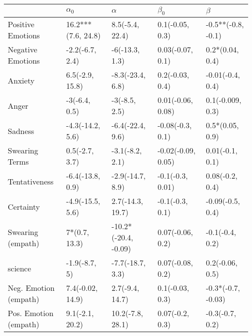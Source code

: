 \begin{tabular}{lllll}
\toprule
{} &          $\alpha_0$ &              $\alpha$ &           $\beta_0$ &             $\beta$ \\
\midrule
Positive Emotions     &  16.2***(7.6, 24.8) &       8.5(-5.4, 22.4) &     0.1(-0.05, 0.3) &  -0.5**(-0.8, -0.1) \\
Negative Emotions     &     -2.2(-6.7, 2.4) &        -6(-13.3, 1.3) &    0.03(-0.07, 0.1) &     0.2*(0.04, 0.4) \\
Anxiety               &     6.5(-2.9, 15.8) &      -8.3(-23.4, 6.8) &     0.2(-0.03, 0.4) &    -0.01(-0.4, 0.4) \\
Anger                 &       -3(-6.4, 0.5) &         -3(-8.5, 2.5) &   0.01(-0.06, 0.08) &    0.1(-0.009, 0.3) \\
Sadness               &    -4.3(-14.2, 5.6) &      -6.4(-22.4, 9.6) &    -0.08(-0.3, 0.1) &     0.5*(0.05, 0.9) \\
Swearing Terms        &      0.5(-2.7, 3.7) &       -3.1(-8.2, 2.1) &  -0.02(-0.09, 0.05) &     0.01(-0.1, 0.1) \\
Tentativeness         &    -6.4(-13.8, 0.9) &      -2.9(-14.7, 8.9) &    -0.1(-0.3, 0.01) &     0.08(-0.2, 0.4) \\
Certainty             &    -4.9(-15.5, 5.6) &      2.7(-14.3, 19.7) &     -0.1(-0.3, 0.1) &    -0.09(-0.5, 0.4) \\
Swearing (empath)     &       7*(0.7, 13.3) &  -10.2*(-20.4, -0.09) &    0.07(-0.06, 0.2) &     -0.1(-0.4, 0.2) \\
science               &       -1.9(-8.7, 5) &      -7.7(-18.7, 3.3) &    0.07(-0.08, 0.2) &     0.2(-0.06, 0.5) \\
Neg. Emotion (empath) &    7.4(-0.02, 14.9) &       2.7(-9.4, 14.7) &     0.1(-0.03, 0.3) &  -0.3*(-0.7, -0.03) \\
Pos. Emotion (empath) &     9.1(-2.1, 20.2) &      10.2(-7.8, 28.1) &     0.07(-0.2, 0.3) &     -0.3(-0.7, 0.2) \\
\bottomrule
\end{tabular}
